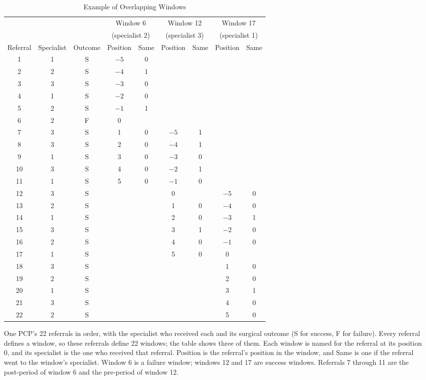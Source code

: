 \documentclass[12pt]{article}
\begin{document}
\begin{table}[!ht]
\centering
\caption{Example of Overlapping Windows}
\label{tab:app_es}
\small
\begin{tabular}{ccccccccc}
\hline\hline
 & & & \multicolumn{2}{c}{Window 6} & \multicolumn{2}{c}{Window 12} & \multicolumn{2}{c}{Window 17} \\
 & & & \multicolumn{2}{c}{(specialist 2)} & \multicolumn{2}{c}{(specialist 3)} & \multicolumn{2}{c}{(specialist 1)} \\
Referral & Specialist & Outcome & Position & Same & Position & Same & Position & Same \\
\hline\hline
1 & 1 & S & $-5$ & 0 & & & & \\
2 & 2 & S & $-4$ & 1 & & & & \\
3 & 3 & S & $-3$ & 0 & & & & \\
4 & 1 & S & $-2$ & 0 & & & & \\
5 & 2 & S & $-1$ & 1 & & & & \\
6 & 2 & F & 0 & & & & & \\
7 & 3 & S & 1 & 0 & $-5$ & 1 & & \\
8 & 3 & S & 2 & 0 & $-4$ & 1 & & \\
9 & 1 & S & 3 & 0 & $-3$ & 0 & & \\
10 & 3 & S & 4 & 0 & $-2$ & 1 & & \\
11 & 1 & S & 5 & 0 & $-1$ & 0 & & \\
12 & 3 & S & & & 0 & & $-5$ & 0 \\
13 & 2 & S & & & 1 & 0 & $-4$ & 0 \\
14 & 1 & S & & & 2 & 0 & $-3$ & 1 \\
15 & 3 & S & & & 3 & 1 & $-2$ & 0 \\
16 & 2 & S & & & 4 & 0 & $-1$ & 0 \\
17 & 1 & S & & & 5 & 0 & 0 & \\
18 & 3 & S & & & & & 1 & 0 \\
19 & 2 & S & & & & & 2 & 0 \\
20 & 1 & S & & & & & 3 & 1 \\
21 & 3 & S & & & & & 4 & 0 \\
22 & 2 & S & & & & & 5 & 0 \\
\hline\hline
\end{tabular}
\begin{minipage}{6in}
\vspace{1ex}
\footnotesize One PCP's 22 referrals in order, with the specialist who received each and its surgical outcome (S for success, F for failure). Every referral defines a window, so these referrals define 22 windows; the table shows three of them. Each window is named for the referral at its position 0, and its specialist is the one who received that referral. Position is the referral's position in the window, and Same is one if the referral went to the window's specialist. Window 6 is a failure window; windows 12 and 17 are success windows. Referrals 7 through 11 are the post-period of window 6 and the pre-period of window 12.
\end{minipage}
\end{table}
\end{document}
